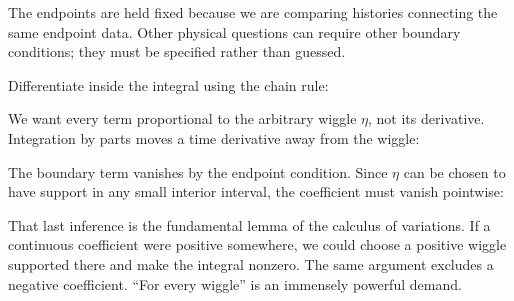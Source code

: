 \documentclass[
  11pt,
  letterpaper,
  oneside,
  openany]{scrbook}
\begin{document}
The endpoints are held fixed because we are comparing histories
connecting the same endpoint data. Other physical questions can require
other boundary conditions; they must be specified rather than guessed.

Differentiate inside the integral using the chain rule:

\begin{center}
\begingroup
{}
\ifdim\wd\grmathbox>\linewidth
\resizebox{\linewidth}{!}{\usebox{\grmathbox}}
\else\usebox{\grmathbox}\fi
\endgroup
\end{center}

We want every term proportional to the arbitrary wiggle \(\eta\), not
its derivative. Integration by parts moves a time derivative away from
the wiggle:

\begin{center}
\begingroup
{}
\ifdim\wd\grmathbox>\linewidth
\resizebox{\linewidth}{!}{\usebox{\grmathbox}}
\else\usebox{\grmathbox}\fi
\endgroup
\end{center}

The boundary term vanishes by the endpoint condition. Since \(\eta\) can
be chosen to have support in any small interior interval, the
coefficient must vanish pointwise:

\begin{center}
\begingroup
{}
\ifdim\wd\grmathbox>\linewidth
\resizebox{\linewidth}{!}{\usebox{\grmathbox}}
\else\usebox{\grmathbox}\fi
\endgroup
\end{center}

That last inference is the fundamental lemma of the calculus of
variations. If a continuous coefficient were positive somewhere, we
could choose a positive wiggle supported there and make the integral
nonzero. The same argument excludes a negative coefficient. ``For every
wiggle'' is an immensely powerful demand.
\end{document}
